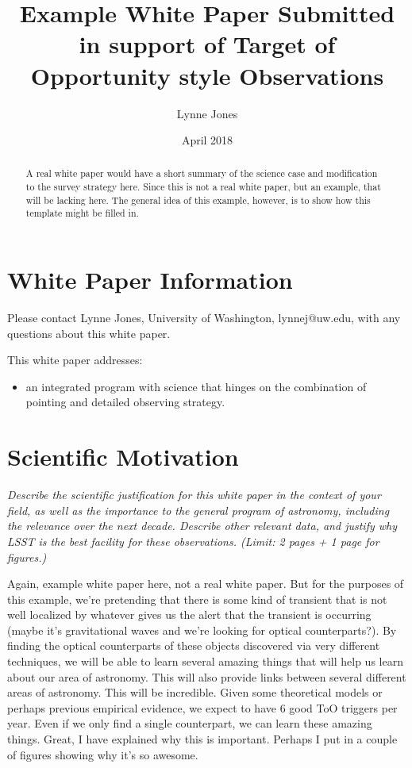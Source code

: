 \documentclass[11pt]{article}
\title{Example White Paper Submitted in support of Target of Opportunity style Observations}
\author{Lynne Jones}
\date{April 2018}
\begin{document}
\maketitle

\begin{abstract}
A real white paper would have a short summary of the science case and modification to the survey strategy
here. Since this is not a real white paper, but an example, that will be lacking here. The general idea of this
example, however, is to show how this template might be filled in. 
\end{abstract}

\section{White Paper Information}
Please contact Lynne Jones, University of Washington, lynnej@uw.edu, with any questions about this white paper. 

This white paper addresses:
\begin{itemize} 
\item an integrated program with science that hinges on the combination of pointing and detailed 
	observing strategy.
\end{itemize}  

\clearpage

\section{Scientific Motivation}

\begin{footnotesize}
{\it Describe the scientific justification for this white paper in the context
of your field, as well as the importance to the general program of astronomy, 
including the relevance over the next decade. 
Describe other relevant data, and justify why LSST is the best facility for these observations.
(Limit: 2 pages + 1 page for figures.)}
\end{footnotesize}

Again, example white paper here, not a real white paper. But for the purposes of this
example, we're pretending that there is some kind of transient that is not well localized
by whatever gives us the alert that the transient is occurring (maybe it's gravitational waves 
and we're looking for optical counterparts?).  By finding the optical counterparts of
these objects discovered via very different techniques, we will be able to learn 
several amazing things that will help us learn about our area of astronomy. This will 
also provide links between several different areas of astronomy. This will be incredible. 
Given some theoretical models or perhaps previous empirical evidence, we expect to have 6 good ToO triggers per year. 
Even if we only find a single counterpart, we can learn these amazing things.
Great, I have explained why this is important.  Perhaps I put in a couple of figures showing why it's so awesome.
\end{document}
